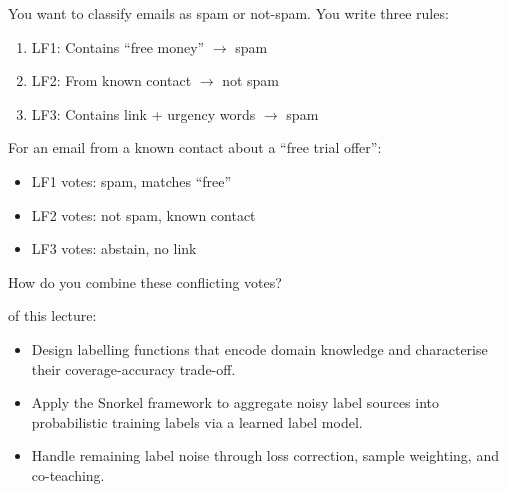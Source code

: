 \begin{marginfigure}
\caption{Three labelling functions voting on examples. They disagree.}
\label{fig:lf_votes}
\end{marginfigure}

You want to classify emails as spam or not-spam. You write three rules:
\begin{enumerate}
    \item LF1: Contains ``free money'' $\to$ spam
    \item LF2: From known contact $\to$ not spam
    \item LF3: Contains link + urgency words $\to$ spam
\end{enumerate}

For an email from a known contact about a ``free trial offer'':
\begin{itemize}
    \item LF1 votes: spam, matches ``free''
    \item LF2 votes: not spam, known contact
    \item LF3 votes: abstain, no link
\end{itemize}

How do you combine these conflicting votes?

 of this lecture:
\begin{itemize}
    \item Design labelling functions that encode domain knowledge and characterise their coverage-accuracy trade-off.
    \item Apply the Snorkel framework to aggregate noisy label sources into probabilistic training labels via a learned label model.
    \item Handle remaining label noise through loss correction, sample weighting, and co-teaching.
\end{itemize}


